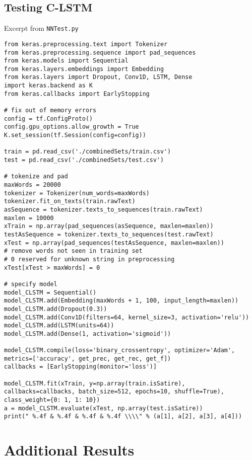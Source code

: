 \documentclass [12 pt] {report}
\begin{document}
\section{Testing C-LSTM}
Excerpt from \texttt{NNTest.py}
\begin{lstlisting}
from keras.preprocessing.text import Tokenizer
from keras.preprocessing.sequence import pad_sequences
from keras.models import Sequential
from keras.layers.embeddings import Embedding
from keras.layers import Dropout, Conv1D, LSTM, Dense
import keras.backend as K
from keras.callbacks import EarlyStopping

# fix out of memory errors
config = tf.ConfigProto()
config.gpu_options.allow_growth = True
K.set_session(tf.Session(config=config))

train = pd.read_csv('./combinedSets/train.csv')
test = pd.read_csv('./combinedSets/test.csv')

# tokenize and pad
maxWords = 20000 
tokenizer = Tokenizer(num_words=maxWords)
tokenizer.fit_on_texts(train.rawText)
asSequence = tokenizer.texts_to_sequences(train.rawText)
maxlen = 10000
xTrain = np.array(pad_sequences(asSequence, maxlen=maxlen))
testAsSequence = tokenizer.texts_to_sequences(test.rawText)
xTest = np.array(pad_sequences(testAsSequence, maxlen=maxlen))
# remove words not seen in training set
# 0 reserved for unknown string in preprocessing
xTest[xTest > maxWords] = 0  

# specify model
model_CLSTM = Sequential()
model_CLSTM.add(Embedding(maxWords + 1, 100, input_length=maxlen))
model_CLSTM.add(Dropout(0.3))
model_CLSTM.add(Conv1D(filters=64, kernel_size=3, activation='relu'))
model_CLSTM.add(LSTM(units=64))
model_CLSTM.add(Dense(1, activation='sigmoid'))

model_CLSTM.compile(loss='binary_crossentropy', optimizer='Adam', metrics=['accuracy', get_prec, get_rec, get_f])
callbacks = [EarlyStopping(monitor='loss')]

model_CLSTM.fit(xTrain, y=np.array(train.isSatire), callbacks=callbacks, batch_size=512, epochs=10, shuffle=True), class_weight={0: 1, 1: 10})
a = model_CLSTM.evaluate(xTest, np.array(test.isSatire))
print(" %.4f & %.4f & %.4f & %.4f \\\\" % (a[1], a[2], a[3], a[4]))

\end{lstlisting}
\chapter{Additional Results}
\end{document}
